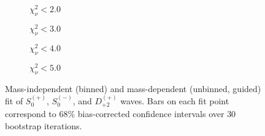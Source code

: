 \begin{figure}[htbp]
    \centering
    \begin{subfigure}{0.45\textwidth}
        
        \caption{$\chi^2_\nu < 2.0$}
    \end{subfigure}
    \hfill
    \begin{subfigure}{0.45\textwidth}
        
        \caption{$\chi^2_\nu < 3.0$}
    \end{subfigure}
    \vspace{1em}
    \begin{subfigure}{0.45\textwidth}
        
        \caption{$\chi^2_\nu < 4.0$}
    \end{subfigure}
    \hfill
    \begin{subfigure}{0.45\textwidth}
        
        \caption{$\chi^2_\nu < 5.0$}
    \end{subfigure}

    \caption{Mass-independent (binned) and mass-dependent (unbinned, guided) fit of $S_{0}^{(+)}$, $S_{0}^{(-)}$, and $D_{+2}^{(+)}$ waves. Bars on each fit point correspond to $68\%$ bias-corrected confidence intervals over $ 30 $ bootstrap iterations.}
    \label{fig:unbinned-guided-fit-all-Spn-D2p}
\end{figure}
